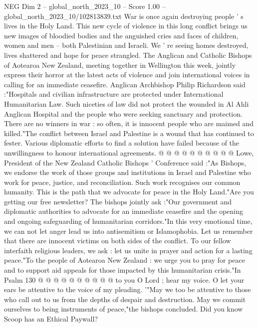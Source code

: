 \begin{textsample}{NEG Dim 2 – global\_north\_2023\_10 – Score 1.00 – global\_north\_2023\_10/102813839.txt}  \label{ex:f2_neg_301}
War is once again destroying people ' s lives in the Holy Land.
This new cycle of violence in this long conflict brings us new images of bloodied bodies and the anguished cries and faces of children, women and men -- both Palestinian and Israeli.
We ' re seeing homes destroyed, lives shattered and hope for peace strangled.
The Anglican and Catholic Bishops of Aotearoa New Zealand, meeting together in Wellington this week, jointly express their horror at the latest acts of violence and join international voices in calling for an immediate ceasefire.
Anglican Archbishop Philip Richardson said :"Hospitals and civilian infrastructure are protected under International Humanitarian Law.
Such niceties of law did not protect the wounded in Al Ahli Anglican Hospital and the people who were seeking sanctuary and protection.
There are no winners in war : so often, it is innocent people who are maimed and killed."The conflict between Israel and Palestine is a wound that has continued to fester.
Various diplomatic efforts to find a solution have failed because of the unwillingness to honour international agreements. @ @ @ @ @ @ @ @ @ @ Lowe, President of the New Zealand Catholic Bishops ' Conference said :"As Bishops, we endorse the work of those groups and institutions in Israel and Palestine who work for peace, justice, and reconciliation.
Such work recognises our common humanity.
This is the path that we advocate for peace in the Holy Land."Are you getting our free newsletter?
The bishops jointly ask :"Our government and diplomatic authorities to advocate for an immediate ceasefire and the opening and ongoing safeguarding of humanitarian corridors."In this very emotional time, we can not let anger lead us into antisemitism or Islamophobia.
Let us remember that there are innocent victims on both sides of the conflict.
To our fellow interfaith religious leaders, we ask : let us unite in prayer and action for a lasting peace."To the people of Aotearoa New Zealand : we urge you to pray for peace and to support aid appeals for those impacted by this humanitarian crisis."In Psalm 130 @ @ @ @ @ @ @ @ @ @ to you O Lord ; hear my voice.
O let your ears be attentive to the voice of my pleading. '"May we too be attentive to those who call out to us from the depths of despair and destruction.
May we commit ourselves to being instruments of peace,"the bishops concluded.
Did you know Scoop has an Ethical Paywall?

\end{textsample}

